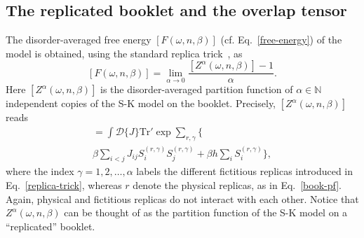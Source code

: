 \documentclass[twocolumn,superscriptaddress,prb,10pt]{revtex4-1}
\def\tr{\textrm{Tr}}
\begin{document}
\subsection{The replicated booklet and the overlap tensor}
\label{replica-sec}

The disorder-averaged free energy $[F(\omega,n,\beta)]$ (cf. 
Eq.~\eqref{free-energy}) of the model is obtained, using the standard replica 
trick~\cite{cardy-book}, as  
%
\begin{equation}
\label{replica-trick}
[F(\omega,n,\beta)]=\lim_{\alpha\to 0}\frac{[Z^\alpha(\omega,n,\beta)]-1}
{\alpha}. 
\end{equation}
%
Here $[Z^\alpha(\omega,n,\beta)]$ is the disorder-averaged partition 
function of $\alpha\in\mathbb{N}$ independent copies of the S-K model on the 
booklet. Precisely, $[Z^\alpha(\omega,n,\beta)]$ reads 
%
\begin{multline}
[Z^\alpha(\omega,n,\beta)]=\int{\mathcal D}\{J\}
\tr'\exp\sum\limits_{r,\gamma}
\Big\{\\
\beta\sum\limits_{i<j}J_{ij}S_i^{(r,\gamma)}S_j^{(r,\gamma)}
+\beta h\sum\limits_{i}S^{(r,\gamma)}_i\Big\},
\label{rep-Z}
\end{multline}
%
where the index $\gamma=1,2,\dots,\alpha$ labels the different fictitious 
replicas introduced in Eq.~\eqref{replica-trick}, whereas $r$ denote the 
physical replicas, as in Eq.~\eqref{book-pf}. Again, physical and fictitious 
replicas do not interact with each other. Notice that $Z^{\alpha}(\omega,n,\beta)$ can be 
thought of as the partition function of the S-K model on a ``replicated'' 
booklet. 
\end{document}
